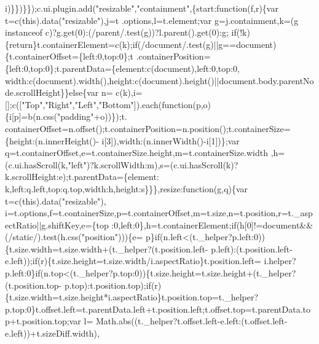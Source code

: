 \begin{DoxyCode}
      i)\}\})\}\});c.ui.plugin.add(\textcolor{stringliteral}{"resizable"},\textcolor{stringliteral}{"containment"},\{start:\textcolor{keyword}{function}(f,r)\{var t=c(\textcolor{keyword}{this}).data(\textcolor{stringliteral}{"resizable"}),j=t
      .options,l=t.element;var g=j.containment,k=(g instanceof c)?g.get(0):(/parent/.test(g))?l.parent().get(0):g;\textcolor{keywordflow}{
      if}(!k)\{\textcolor{keywordflow}{return}\}t.containerElement=c(k);\textcolor{keywordflow}{if}(/document/.test(g)||g==document)\{t.containerOffset=\{left:0,top:0\};t
      .containerPosition=\{left:0,top:0\};t.parentData=\{element:c(document),left:0,top:0,
      width:c(document).width(),height:c(document).height()||document.body.parentNode.scrollHeight\}\}\textcolor{keywordflow}{else}\{var n=
      c(k),i=[];c([\textcolor{stringliteral}{"Top"},\textcolor{stringliteral}{"Right"},\textcolor{stringliteral}{"Left"},\textcolor{stringliteral}{"Bottom"}]).each(\textcolor{keyword}{function}(p,o)\{i[p]=b(n.css(\textcolor{stringliteral}{"padding"}+o))\});t.
      containerOffset=n.offset();t.containerPosition=n.position();t.containerSize=\{height:(n.innerHeight()-
      i[3]),width:(n.innerWidth()-i[1])\};var q=t.containerOffset,e=t.containerSize.height,m=t.containerSize.width
      ,h=(c.ui.hasScroll(k,\textcolor{stringliteral}{"left"})?k.scrollWidth:m),s=(c.ui.hasScroll(k)?k.scrollHeight:e);t.parentData=\{element:
      k,left:q.left,top:q.top,width:h,height:s\}\}\},resize:\textcolor{keyword}{function}(g,q)\{var t=c(\textcolor{keyword}{this}).data(\textcolor{stringliteral}{"resizable"}),
      i=t.options,f=t.containerSize,p=t.containerOffset,m=t.size,n=t.position,r=t.\_aspectRatio||g.shiftKey,e=\{top
      :0,left:0\},h=t.containerElement;\textcolor{keywordflow}{if}(h[0]!=document&&(/\textcolor{keyword}{static}/).test(h.css(\textcolor{stringliteral}{"position"})))\{e=
      p\}\textcolor{keywordflow}{if}(n.left<(t.\_helper?p.left:0))\{t.size.width=t.size.width+(t.\_helper?(t.position.left-
      p.left):(t.position.left-e.left));\textcolor{keywordflow}{if}(r)\{t.size.height=t.size.width/i.aspectRatio\}t.position.left=
      i.helper?p.left:0\}\textcolor{keywordflow}{if}(n.top<(t.\_helper?p.top:0))\{t.size.height=t.size.height+(t.\_helper?(t.position.top-
      p.top):t.position.top);\textcolor{keywordflow}{if}(r)\{t.size.width=t.size.height*i.aspectRatio\}t.position.top=t.\_helper?
      p.top:0\}t.offset.left=t.parentData.left+t.position.left;t.offset.top=t.parentData.top+t.position.top;var l=
      Math.abs((t.\_helper?t.offset.left-e.left:(t.offset.left-e.left))+t.sizeDiff.width),

\end{DoxyCode}
